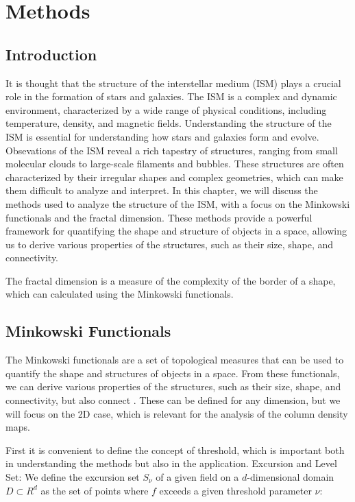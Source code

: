\chapter{Methods}
\label{ch:methods}

\section{Introduction}

It is thought that the structure of the interstellar medium (ISM) plays a crucial role in the formation of stars and galaxies. The ISM is a complex and dynamic environment, characterized by a wide range of physical conditions, including temperature, density, and magnetic fields. Understanding the structure of the ISM is essential for understanding how stars and galaxies form and evolve.
Obsevations of the ISM reveal a rich tapestry of structures, ranging from small molecular clouds to large-scale filaments and bubbles. These structures are often characterized by their irregular shapes and complex geometries, which can make them difficult to analyze and interpret.
In this chapter, we will discuss the methods used to analyze the structure of the ISM, with a focus on the Minkowski functionals and the fractal dimension. These methods provide a powerful framework for quantifying the shape and structure of objects in a space, allowing us to derive various properties of the structures, such as their size, shape, and connectivity.

The fractal dimension is a measure of the complexity of the border of a shape, which can calculated using the Minkowski functionals.

\section{Minkowski Functionals}

The Minkowski functionals are a set of topological measures that can be used to quantify the shape and structures of objects in a space. From these functionals, we can derive various properties of the structures, such as their size, shape, and connectivity, but also connect .
These can be defined for any dimension, but we will focus on the 2D case, which is relevant for the analysis of the column density maps.

First it is convenient to define the concept of threshold, which is important both in understanding the methods but also in the application.
Excursion and Level Set: We define the excursion set $S_{\nu}$ of a given field on a $d$-dimensional domain $D \subset R^d$ as the set of points where $f$ exceeds a given threshold parameter $\nu$:

